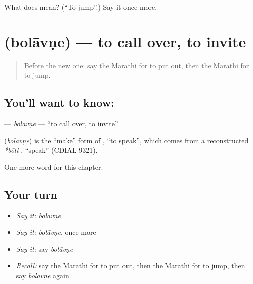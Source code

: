 \begin{tcolorbox}[breakable,colback=teal!4,colframe=teal!35!black,title={Before you move on}]
What does   mean? (\textquotedblleft{}To jump\textquotedblright{}.) Say it once more.
\end{tcolorbox}
\section[\texorpdfstring{\mr{बोलावणे} (bolāvṇe)}{बोलावणे (bolāvṇe)}]{ (bolāvṇe) — to call over, to invite}

\label{lesson:MR-C162-bolavne}



\begin{quote}
Before the new one: say the Marathi for to put out, then the Marathi for to jump.
\end{quote}

\subsection*{You'll want to know: }
\textbf{} — \emph{bolāvṇe} — \textquotedblleft{}to call over, to invite\textquotedblright{}.

\begin{cousinweb}
\textbf{} (\emph{bolāvṇe}) is the \textquotedblleft{}make\textquotedblright{} form of \textbf{}, \textquotedblleft{}to speak\textquotedblright{}, which comes from a reconstructed \emph{*bōll-}, \textquotedblleft{}speak\textquotedblright{} (CDIAL 9321).
\end{cousinweb}

\begin{grammarlens}[title={What you've built}]
One more word for this chapter.
\end{grammarlens}

\subsection*{Your turn}
\begin{itemize}
\raggedright
  \item \emph{Say it:} \emph{bolāvṇe}
  \item \emph{Say it:} \emph{bolāvṇe}, once more
  \item \emph{Say it:} say \emph{bolāvṇe}
  \item \emph{Recall:} say the Marathi for to put out, then the Marathi for to jump, then say \emph{bolāvṇe} again
\end{itemize}

